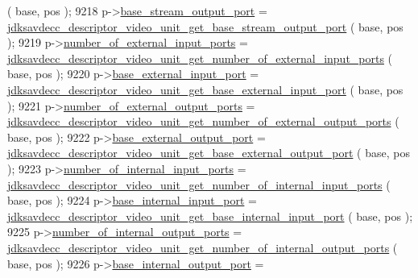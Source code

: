 \begin{DoxyCode}
      ( base, pos );
9218         p->\hyperlink{structjdksavdecc__descriptor__video__unit_a234b990d7bb2f22da0ba4bebadc71a70}{base\_stream\_output\_port} = 
      \hyperlink{group__descriptor__video_gaa459170e0f0d74d9a0d9e6450f0f648f}{jdksavdecc\_descriptor\_video\_unit\_get\_base\_stream\_output\_port}
      ( base, pos );
9219         p->\hyperlink{structjdksavdecc__descriptor__video__unit_a7e5320abe3b528f879c3314a19269335}{number\_of\_external\_input\_ports} = 
      \hyperlink{group__descriptor__video_ga6b04c0b6235d68677dd86d4f367a9ea9}{jdksavdecc\_descriptor\_video\_unit\_get\_number\_of\_external\_input\_ports}
      ( base, pos );
9220         p->\hyperlink{structjdksavdecc__descriptor__video__unit_a292b30d547e9769f7ec471a9e26ae2c2}{base\_external\_input\_port} = 
      \hyperlink{group__descriptor__video_ga196034a3f6b4470ec4accc3e5d9277c4}{jdksavdecc\_descriptor\_video\_unit\_get\_base\_external\_input\_port}
      ( base, pos );
9221         p->\hyperlink{structjdksavdecc__descriptor__video__unit_ae7140af180c1c9cc1f5a6a414fe26ebb}{number\_of\_external\_output\_ports} = 
      \hyperlink{group__descriptor__video_ga26509d66efd0bb690f4c4202c5d63e13}{jdksavdecc\_descriptor\_video\_unit\_get\_number\_of\_external\_output\_ports}
      ( base, pos );
9222         p->\hyperlink{structjdksavdecc__descriptor__video__unit_a3103a3898813f4104c1d1d7f984e8229}{base\_external\_output\_port} = 
      \hyperlink{group__descriptor__video_ga4fbc461f3562c8da5614197e9ef3e822}{jdksavdecc\_descriptor\_video\_unit\_get\_base\_external\_output\_port}
      ( base, pos );
9223         p->\hyperlink{structjdksavdecc__descriptor__video__unit_af14e1056175671f086901f07420bf46f}{number\_of\_internal\_input\_ports} = 
      \hyperlink{group__descriptor__video_gaaad221b2d6773196c2084dd54d58abdd}{jdksavdecc\_descriptor\_video\_unit\_get\_number\_of\_internal\_input\_ports}
      ( base, pos );
9224         p->\hyperlink{structjdksavdecc__descriptor__video__unit_a11d926248b31db1ff60e6416c9c3d996}{base\_internal\_input\_port} = 
      \hyperlink{group__descriptor__video_ga74c6cd94fbede6dde355592e553ecb0e}{jdksavdecc\_descriptor\_video\_unit\_get\_base\_internal\_input\_port}
      ( base, pos );
9225         p->\hyperlink{structjdksavdecc__descriptor__video__unit_aeba303ee329974d2a1c3ff9b5b41ed4b}{number\_of\_internal\_output\_ports} = 
      \hyperlink{group__descriptor__video_gaeb69c726c35d20fe51305d189420c97f}{jdksavdecc\_descriptor\_video\_unit\_get\_number\_of\_internal\_output\_ports}
      ( base, pos );
9226         p->\hyperlink{structjdksavdecc__descriptor__video__unit_a238f1b0f1c8556b5e9586d93541169a5}{base\_internal\_output\_port} = 

\end{DoxyCode}
